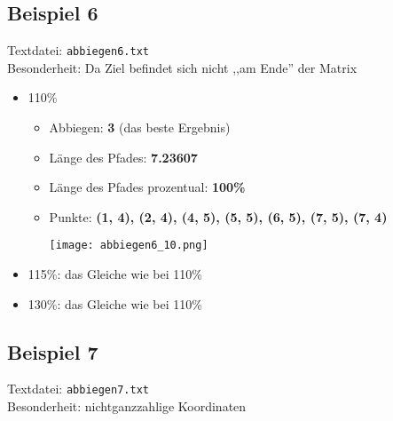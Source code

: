 \documentclass[a4paper,10pt,ngerman]{scrartcl}
\begin{document}
\subsection{Beispiel 6}\label{zielindermitte}
Textdatei: \texttt{abbiegen6.txt}\\
Besonderheit: Da Ziel befindet sich nicht ,,am Ende'' der Matrix

\begin{itemize}
  \item 110\%    
    \begin{itemize}
      \item Abbiegen: \textbf{3} (das beste Ergebnis)
      \item Länge des Pfades: \textbf{7.23607}
      \item Länge des Pfades prozentual: \textbf{100\%}
      \item Punkte: \textbf{(1, 4), (2, 4), (4, 5), (5, 5), (6, 5), (7, 5), (7, 4)}
\begin{center}
\texttt{[image: abbiegen6\_10.png]}
\end{center}
  \end{itemize}
  \item 115\%: das Gleiche wie bei 110\%
  \item 130\%: das Gleiche wie bei 110\%
\end{itemize}

\subsection{Beispiel 7}\label{nichtganzzahlige}
Textdatei: \texttt{abbiegen7.txt}\\
Besonderheit: nichtganzzahlige Koordinaten
\end{document}
